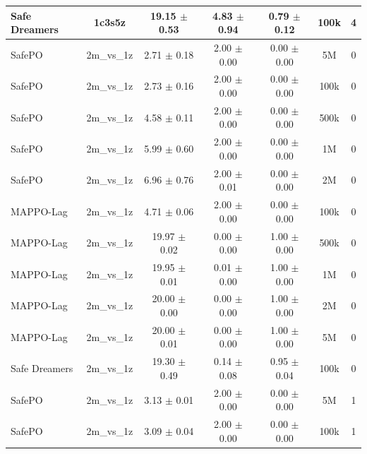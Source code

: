\begin{longtable}{lcccccc}
Safe Dreamers & 1c3s5z & 19.15 $\pm$ 0.53 & 4.83 $\pm$ 0.94 & 0.79 $\pm$ 0.12 & 100k & 4 \\
\midrule
SafePO & 2m\_vs\_1z & \textcolor{green!60!black}{2.71 $\pm$ 0.18} & \textcolor{green!60!black}{2.00 $\pm$ 0.00} & \textcolor{green!60!black}{0.00 $\pm$ 0.00} & 5M & 0 \\
SafePO & 2m\_vs\_1z & \textcolor{green!60!black}{2.73 $\pm$ 0.16} & \textcolor{green!60!black}{2.00 $\pm$ 0.00} & \textcolor{green!60!black}{0.00 $\pm$ 0.00} & 100k & 0 \\
SafePO & 2m\_vs\_1z & \textcolor{green!60!black}{4.58 $\pm$ 0.11} & \textcolor{green!60!black}{2.00 $\pm$ 0.00} & \textcolor{green!60!black}{0.00 $\pm$ 0.00} & 500k & 0 \\
SafePO & 2m\_vs\_1z & \textcolor{green!60!black}{5.99 $\pm$ 0.60} & \textcolor{green!60!black}{2.00 $\pm$ 0.00} & \textcolor{green!60!black}{0.00 $\pm$ 0.00} & 1M & 0 \\
SafePO & 2m\_vs\_1z & \textcolor{green!60!black}{6.96 $\pm$ 0.76} & \textcolor{green!60!black}{2.00 $\pm$ 0.01} & \textcolor{green!60!black}{0.00 $\pm$ 0.00} & 2M & 0 \\
MAPPO-Lag & 2m\_vs\_1z & \textcolor{green!60!black}{4.71 $\pm$ 0.06} & \textcolor{green!60!black}{2.00 $\pm$ 0.00} & \textcolor{green!60!black}{0.00 $\pm$ 0.00} & 100k & 0 \\
MAPPO-Lag & 2m\_vs\_1z & \textcolor{red!70!black}{19.97 $\pm$ 0.02} & \textcolor{red!70!black}{0.00 $\pm$ 0.00} & \textcolor{red!70!black}{1.00 $\pm$ 0.00} & 500k & 0 \\
MAPPO-Lag & 2m\_vs\_1z & \textcolor{red!70!black}{19.95 $\pm$ 0.01} & \textcolor{red!70!black}{0.01 $\pm$ 0.00} & \textcolor{red!70!black}{1.00 $\pm$ 0.00} & 1M & 0 \\
MAPPO-Lag & 2m\_vs\_1z & \textcolor{red!70!black}{2\textcolor{red!70!black}{0.00 $\pm$ 0.00}} & 0.00 $\pm$ 0.00 & \textcolor{red!70!black}{1.00 $\pm$ 0.00} & 2M & 0 \\
MAPPO-Lag & 2m\_vs\_1z & \textcolor{red!70!black}{20.00 $\pm$ 0.01} & \textcolor{red!70!black}{0.00 $\pm$ 0.00} & \textcolor{red!70!black}{1.00 $\pm$ 0.00} & 5M & 0 \\
Safe Dreamers & 2m\_vs\_1z & 19.30 $\pm$ 0.49 & 0.14 $\pm$ 0.08 & 0.95 $\pm$ 0.04 & 100k & 0 \\
\midrule
SafePO & 2m\_vs\_1z & \textcolor{green!60!black}{3.13 $\pm$ 0.01} & \textcolor{green!60!black}{2.00 $\pm$ 0.00} & \textcolor{green!60!black}{0.00 $\pm$ 0.00} & 5M & 1 \\
SafePO & 2m\_vs\_1z & \textcolor{green!60!black}{3.09 $\pm$ 0.04} & \textcolor{green!60!black}{2.00 $\pm$ 0.00} & \textcolor{green!60!black}{0.00 $\pm$ 0.00} & 100k & 1 \\

\end{longtable}

